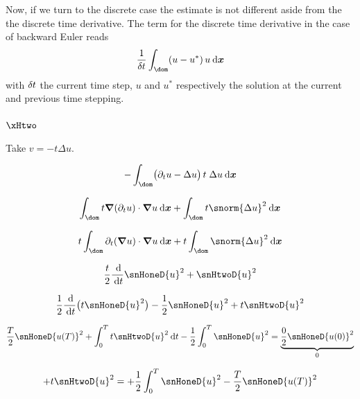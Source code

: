 \medskip
Now, if we turn to the discrete case the estimate is not different aside from the the discrete time derivative.
The term for the discrete time derivative in the case of backward Euler reads
\begin{equation*}
\dfrac{1}{\kt}\int_\dom (u - u^\ast)\, u \dxd
\end{equation*}
with $\delta \hspace{-0.05ex} t$ the current time step, $u$ and $u^\ast$ respectively the solution at the current and previous time stepping.

\subsubsection{$\xHtwo$}

Take $v = - t \Delta u$.

\begin{equation*}
- \int_\dom \bigl(\partial_t u - \Delta u\bigr)\,t\;\Delta u \dxd
\end{equation*}


\begin{equation*}
\int_\dom t \Grad(\partial_t u)\cdot\Grad u  \dxd + \int_\dom t \snorm{\Delta u}^2 \dxd
\end{equation*}

\begin{equation*}
t \int_\dom \partial_t(\Grad u)\cdot\Grad u \dxd + t \int_\dom \snorm{\Delta u}^2 \dxd
\end{equation*}

\begin{equation*}
\dfrac{t}{2}\dfrac{\md}{\dt}\snHoneD{u}^2 + \snHtwoD{u}^2
\end{equation*}

\begin{equation*}
\dfrac{1}{2}\dfrac{\md}{\dt}\bigl(t \snHoneD{u}^2\bigr) - \dfrac{1}{2} \snHoneD{u}^2 + t\snHtwoD{u}^2
\end{equation*}

\begin{equation*}
\dfrac{T}{2}\snHoneD{u(T)}^2 + \int_0^T t\snHtwoD{u}^2 \dt - \dfrac{1}{2}\int_0^T \snHoneD{u}^2 = \underbrace{\dfrac{0}{2}\snHoneD{u(0)}^2}_{0}
\end{equation*}

\begin{equation*}
+ t\snHtwoD{u}^2 = + \dfrac{1}{2}\int_0^T \snHoneD{u}^2 - \dfrac{T}{2}\snHoneD{u(T)}^2
\end{equation*}























